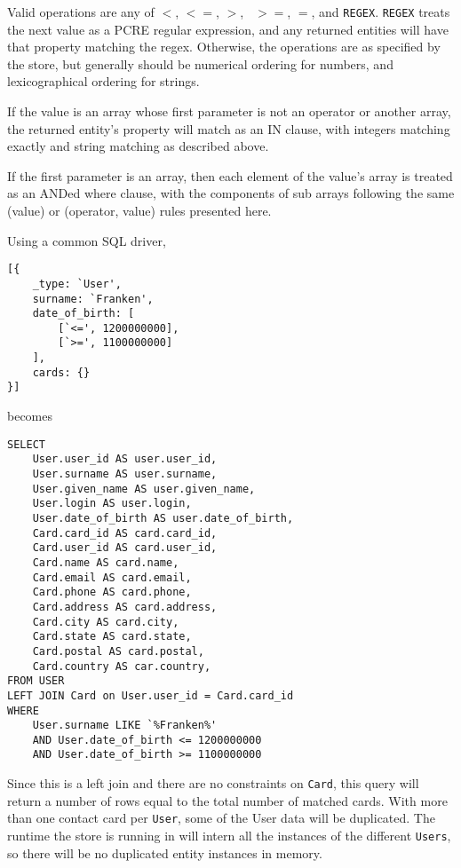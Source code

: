 \documentclass{article}
\newcommand{\ilcode}{\tt}
\begin{document}
Valid operations are any of {\ilcode $<$}, {\ilcode $<=$}, {\ilcode $>$}, {\ilcode
$>=$}, {\ilcode $=$}, and {\ilcode REGEX}. {\ilcode REGEX} treats the next value
as a PCRE regular expression, and any returned entities will have that property
matching the regex. Otherwise, the operations are as specified by the store, but
generally should be numerical ordering for numbers, and lexicographical ordering
for strings.



If the value is an array whose first parameter is not an operator or another
array, the returned entity's property will match as an IN clause, with integers
matching exactly and string matching as described above.

If the first parameter is an array, then each element of the value's array is
treated as an ANDed where clause, with the components of sub arrays following
the same (value) or (operator, value) rules presented here.

Using a common SQL driver,
\linespread{1}
\begin{lstlisting}
[{
	_type: `User',
	surname: `Franken',
	date_of_birth: [
		[`<=', 1200000000],
		[`>=', 1100000000]
	],
	cards: {}
}]
\end{lstlisting}
\linespread{1.6}

becomes

\linespread{1}
\begin{lstlisting}
SELECT
	User.user_id AS user.user_id,
	User.surname AS user.surname,
	User.given_name AS user.given_name,
	User.login AS user.login,
	User.date_of_birth AS user.date_of_birth,
	Card.card_id AS card.card_id,
	Card.user_id AS card.user_id,
	Card.name AS card.name,
	Card.email AS card.email,
	Card.phone AS card.phone,
	Card.address AS card.address,
	Card.city AS card.city,
	Card.state AS card.state,
	Card.postal AS card.postal,
	Card.country AS car.country,
FROM USER
LEFT JOIN Card on User.user_id = Card.card_id
WHERE
	User.surname LIKE `%Franken%'
	AND User.date_of_birth <= 1200000000
	AND User.date_of_birth >= 1100000000
\end{lstlisting}
\linespread{1.6}

Since this is a left join and there are no constraints on {\ilcode Card}, this
query will return a number of rows equal to the total number of matched cards.
With more than one contact card per {\ilcode User}, some of the User data will
be duplicated. The runtime the store is running in will intern all the
instances of the different {\ilcode Users}, so there will be no duplicated entity
instances in memory.
\end{document}
